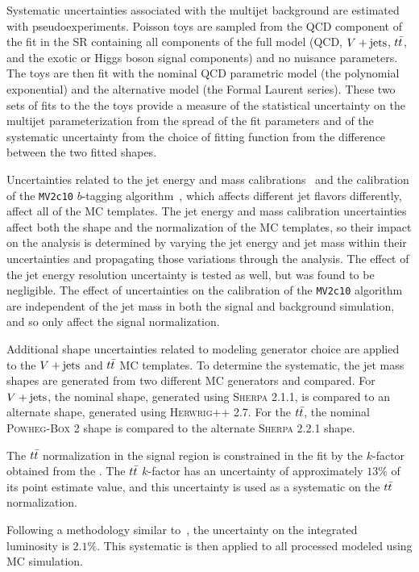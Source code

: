 Systematic uncertainties associated with the multijet background are estimated with pseudoexperiments.
Poisson toys are sampled from the QCD component of the fit in the SR containing all components of the full model (QCD, $V + \text{jets}$, $t\bar{t}$, and the exotic or Higgs boson signal components) and no nuisance parameters.
The toys are then fit with the nominal QCD parametric model (the polynomial exponential) and the alternative model (the Formal Laurent series).
These two sets of fits to the the toys provide a measure of the statistical uncertainty on the multijet parameterization from the spread of the fit parameters and of the systematic uncertainty from the choice of fitting function from the difference between the two fitted shapes.

Uncertainties related to the \largeR{} jet energy and mass calibrations~\cite{JETM-2018-02} and the calibration of the \texttt{MV2c10} $b$-tagging algorithm~\cite{PERF-2016-05}, which affects different jet flavors differently, affect all of the MC templates.
The \largeR{} jet energy and mass calibration uncertainties affect both the shape and the normalization of the MC templates, so their impact on the analysis is determined by varying the jet energy and jet mass within their uncertainties and propagating those variations through the analysis.
The effect of the jet energy resolution uncertainty is tested as well, but was found to be negligible.
The effect of uncertainties on the calibration of the \texttt{MV2c10} algorithm are independent of the \largeR{} jet mass in both the signal and background simulation, and so only affect the signal normalization.

Additional shape uncertainties related to modeling generator choice are applied to the $V + \text{jets}$ and $t\bar{t}$ MC templates.
To determine the systematic, the \largeR{} jet mass shapes are generated from two different MC generators and compared.
For $V + \text{jets}$, the nominal shape, generated using \textsc{Sherpa} 2.1.1, is compared to an alternate shape, generated using \textsc{Herwrig++} 2.7.
For the $t\bar{t}$, the nominal \textsc{Powheg-Box} 2 shape is compared to the alternate \textsc{Sherpa} 2.2.1 shape.

The $t\bar{t}$ normalization in the signal region is constrained in the fit by the $k$-factor obtained from the \CRttbar{}.
The $t\bar{t}$ $k$-factor has an uncertainty of approximately $13\%$ of its point estimate value, and this uncertainty is used as a systematic on the $t\bar{t}$ normalization.

Following a methodology similar to~\cite{DAPR-2011-01}, the uncertainty on the integrated luminosity is $2.1\%$.
This systematic is then applied to all processed modeled using MC simulation.


